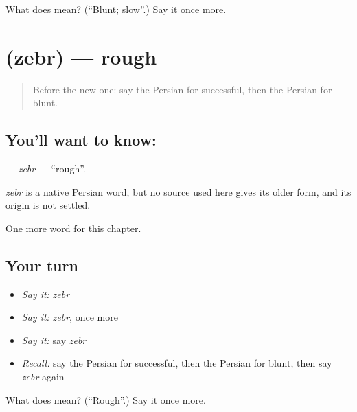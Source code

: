 \begin{tcolorbox}[breakable,colback=teal!4,colframe=teal!35!black,title={Before you move on}]
What does  mean? (\textquotedblleft{}Blunt; slow\textquotedblright{}.) Say it once more.
\end{tcolorbox}
\section[\texorpdfstring{\fa{زبر} (zebr)}{زبر (zebr)}]{ (zebr) — rough}

\label{lesson:FA-C164-zebr}



\begin{quote}
Before the new one: say the Persian for successful, then the Persian for blunt.
\end{quote}

\subsection*{You'll want to know: }
\textbf{} — \emph{zebr} — \textquotedblleft{}rough\textquotedblright{}.

\begin{cousinweb}
\emph{zebr} is a native Persian word, but no source used here gives its older form, and its origin is not settled.
\end{cousinweb}

\begin{grammarlens}[title={What you've built}]
One more word for this chapter.
\end{grammarlens}

\subsection*{Your turn}
\begin{itemize}
\raggedright
  \item \emph{Say it:} \emph{zebr}
  \item \emph{Say it:} \emph{zebr}, once more
  \item \emph{Say it:} say \emph{zebr}
  \item \emph{Recall:} say the Persian for successful, then the Persian for blunt, then say \emph{zebr} again
\end{itemize}

\begin{tcolorbox}[breakable,colback=teal!4,colframe=teal!35!black,title={Before you move on}]
What does  mean? (\textquotedblleft{}Rough\textquotedblright{}.) Say it once more.
\end{tcolorbox}
